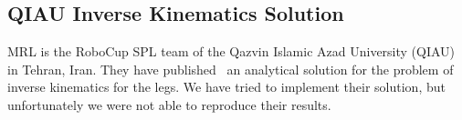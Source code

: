 \subsection{QIAU Inverse Kinematics Solution}
MRL is the RoboCup SPL team of the Qazvin Islamic Azad University (QIAU) in Tehran, Iran. They have published~\cite{iran} an analytical solution for the problem of inverse kinematics for the legs. We have tried to implement their solution, but unfortunately we were not able to reproduce their results.





